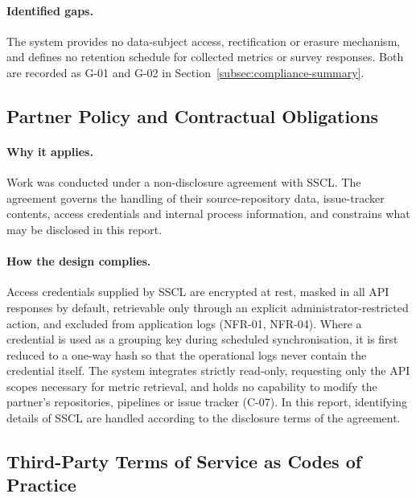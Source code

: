 \paragraph{Identified gaps.}
The system provides no data-subject access, rectification or erasure mechanism,
and defines no retention schedule for collected metrics or survey responses. Both
are recorded as G-01 and G-02 in Section~\ref{subsec:compliance-summary}.


\subsection{Partner Policy and Contractual Obligations}
\label{subsec:partner-policy}

\paragraph{Why it applies.}
Work was conducted under a non-disclosure agreement with SSCL. The agreement
governs the handling of their source-repository data, issue-tracker contents,
access credentials and internal process information, and constrains what may be
disclosed in this report.

\paragraph{How the design complies.}
Access credentials supplied by SSCL are encrypted at rest, masked in all
API responses by default, retrievable only through an explicit
administrator-restricted action, and excluded from application logs
(NFR-01, NFR-04). Where a credential is used as a grouping key during scheduled
synchronisation, it is first reduced to a one-way hash so that the operational
logs never contain the credential itself. The system integrates strictly
read-only, requesting only the API scopes necessary for metric retrieval, and
holds no capability to modify the partner's repositories, pipelines or issue
tracker (C-07). In this report, identifying details of SSCL are handled
according to the disclosure terms of the agreement.

\subsection{Third-Party Terms of Service as Codes of Practice}
\label{subsec:third-party-terms}

